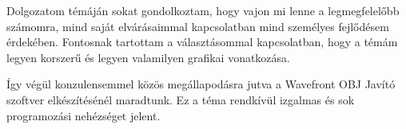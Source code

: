 
Dolgozatom témáján sokat gondolkoztam, hogy vajon mi lenne a legmegfelelőbb számomra, mind saját elvárásaimmal kapcsolatban mind személyes fejlődésem érdekében. Fontosnak tartottam a választásommal kapcsolatban, hogy a témám legyen korszerű és legyen valamilyen grafikai vonatkozása.

Így végül konzulensemmel közös megállapodásra jutva a Wavefront OBJ Javító szoftver elkészítésénél maradtunk. Ez a téma rendkívül izgalmas és sok programozási nehézséget jelent.


